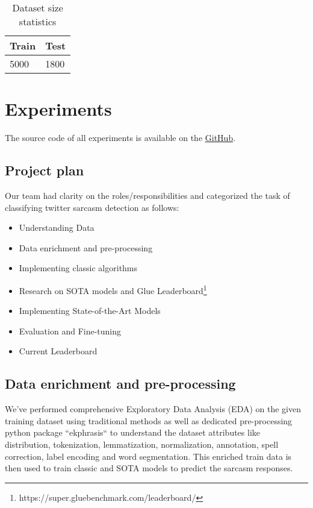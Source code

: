 \documentclass[conference]{IEEEtran}
\begin{document}
\begin{table}[htbp]
\caption{Dataset size statistics}
\begin{center}
\begin{tabular}{|l|l|}
\hline
\textbf{Train} & \textbf{Test} \\ \hline
5000 & 1800          \\ \hline
\end{tabular}
\label{tab1}
\end{center}
\end{table}

\section{Experiments}
The source code of all experiments is available on the \href{https://github.com/dheerajpatta/CourseProject}{GitHub}.

\subsection{Project plan}

Our team had clarity on the roles/responsibilities and categorized the task of classifying twitter sarcasm detection as follows:

\begin{itemize}
	\item Understanding Data
	\item Data enrichment and pre-processing
	\item Implementing classic algorithms
	\item Research on SOTA models and Glue Leaderboard\footnote{https://super.gluebenchmark.com/leaderboard/}
	\item Implementing State-of-the-Art Models
	\item Evaluation and Fine-tuning
	\item Current Leaderboard
\end{itemize}

\subsection{Data enrichment and pre-processing}
We’ve performed comprehensive Exploratory Data Analysis (EDA) on the given training dataset using traditional methods as well as dedicated pre-processing python package ``ekphrasis`` to understand the dataset attributes like distribution, tokenization, lemmatization, normalization, annotation, spell correction, label encoding and word segmentation. This enriched train data is then used to train classic and SOTA models to predict the sarcasm responses. 
\end{document}
